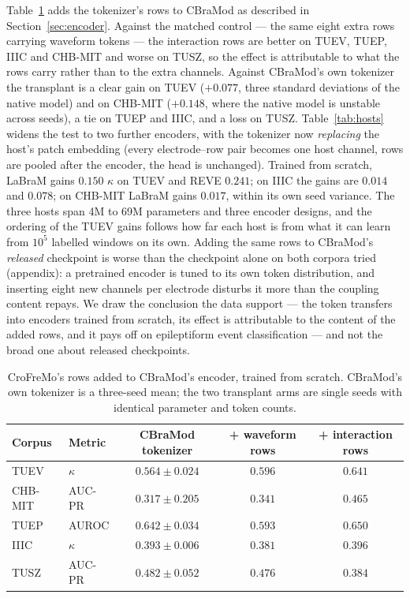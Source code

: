 Table~\ref{tab:transplant} adds the tokenizer's rows to CBraMod as
described in Section~\ref{sec:encoder}. Against the matched control ---
the same eight extra rows carrying waveform tokens --- the interaction
rows are better on TUEV, TUEP, IIIC and CHB-MIT and worse on TUSZ, so
the effect is attributable to what the rows carry rather than to the
extra channels. Against CBraMod's own tokenizer the transplant is a clear
gain on TUEV ($+0.077$, three standard deviations of the native model) and
on CHB-MIT ($+0.148$, where the native model is unstable across seeds), a
tie on TUEP and IIIC, and a loss on TUSZ.
Table~\ref{tab:hosts} widens the test to two further encoders, with
the tokenizer now \emph{replacing} the host's patch embedding (every
electrode--row pair becomes one host channel, rows are pooled after the
encoder, the head is unchanged). Trained from scratch, LaBraM gains
$0.150$ $\kappa$ on TUEV and REVE $0.241$; on IIIC the gains are
$0.014$ and $0.078$; on CHB-MIT LaBraM gains $0.017$, within its own
seed variance. The three hosts span 4M to 69M parameters and three
encoder designs, and the ordering of the TUEV gains follows how far each
host is from what it can learn from $10^5$ labelled windows on its own.
Adding the same rows to CBraMod's \emph{released} checkpoint is worse
than the checkpoint alone on both corpora tried (appendix): a pretrained
encoder is tuned to its own token distribution, and inserting eight new
channels per electrode disturbs it more than the coupling content
repays. We draw the conclusion the data support --- the token transfers
into encoders trained from scratch, its effect is attributable to the
content of the added rows, and it pays off on epileptiform event
classification --- and not the broad one about released checkpoints.

\begin{table}[t]
\centering
\small
\caption{CroFreMo's rows added to CBraMod's encoder, trained from scratch.
CBraMod's own tokenizer is a three-seed mean; the two transplant arms are
single seeds with identical parameter and token counts.}
\label{tab:transplant}
\begin{tabular}{llccc}
\toprule
Corpus & Metric & CBraMod tokenizer & + waveform rows & + interaction rows \\
\midrule
TUEV & $\kappa$ & $0.564 \pm 0.024$ & $0.596$ & $\mathbf{0.641}$ \\
CHB-MIT & AUC-PR & $0.317 \pm 0.205$ & $0.341$ & $\mathbf{0.465}$ \\
TUEP & AUROC & $0.642 \pm 0.034$ & $0.593$ & $\mathbf{0.650}$ \\
IIIC & $\kappa$ & $0.393 \pm 0.006$ & $0.381$ & $0.396$ \\
TUSZ & AUC-PR & $\mathbf{0.482 \pm 0.052}$ & $0.476$ & $0.384$ \\
\bottomrule
\end{tabular}
\end{table}

